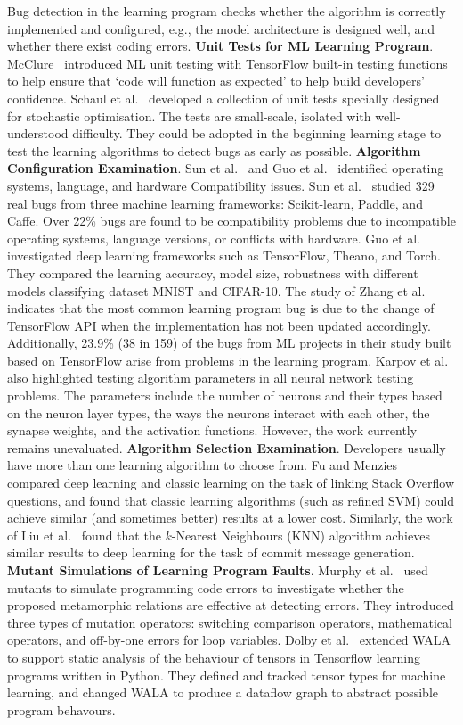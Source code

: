 \label{sec:trainingprogramtesting}
Bug detection in the learning program checks whether the algorithm is correctly implemented and configured, e.g., the model architecture is designed well, and whether there exist coding errors.
\noindent \textbf{Unit Tests for ML Learning Program}.
McClure~ introduced ML unit testing with TensorFlow built-in testing functions to help ensure that `code will function as expected' to help build developers' confidence.
Schaul et al.~ developed a collection of unit tests specially designed for stochastic optimisation. 
The tests are small-scale, isolated with well-understood difficulty. 
They could be adopted in the beginning learning stage to test the learning algorithms to detect bugs as early as possible.
\noindent \textbf{Algorithm Configuration Examination}.
Sun et al.~ and Guo et al.~ identified operating systems, language, and hardware Compatibility issues.
Sun et al.~ studied 329 real bugs from three machine learning frameworks: 
Scikit-learn, Paddle, and Caffe. 
Over 22\% bugs are found to be compatibility problems due to incompatible operating systems, language versions, or conflicts with hardware.
Guo et al.~ investigated deep learning frameworks such as TensorFlow, Theano, and Torch.
They compared the learning accuracy, model size, robustness with different models classifying dataset MNIST and CIFAR-10.
The study of Zhang et al.~ indicates that the most common learning program bug is due to the change of TensorFlow API when the implementation has not been updated accordingly.
Additionally, 23.9\% (38 in 159) of the bugs from ML projects in their study built based on TensorFlow arise from problems in the learning program.
Karpov et al.~ also highlighted testing algorithm parameters in all neural network testing problems. 
The parameters include the number of neurons and their types based on the neuron layer types, the ways the neurons interact with each other, the synapse weights, and the activation functions.
However, the work currently remains unevaluated.
\noindent \textbf{Algorithm Selection Examination}.
Developers usually have more than one learning algorithm to choose from.
Fu and Menzies~ compared deep learning and classic learning on the task of linking Stack Overflow questions, and found that classic learning algorithms (such as refined SVM) could achieve similar (and sometimes better) results at a lower cost. 
Similarly, the work of Liu et al.~ found that the $k$-Nearest Neighbours (KNN) algorithm achieves similar results to deep learning for the task of commit message generation.
\noindent \textbf{Mutant Simulations of Learning Program Faults}.
Murphy et al.~ used mutants to simulate programming code errors to investigate whether the proposed metamorphic relations are effective at detecting errors.
They introduced three types of mutation operators: switching comparison operators, mathematical operators, and off-by-one errors for loop variables.
Dolby et al.~ extended WALA to support static analysis of the behaviour of tensors in Tensorflow learning programs written in Python.
They defined and tracked tensor types for machine learning, and changed WALA to produce a dataflow graph to abstract possible program behavours.

